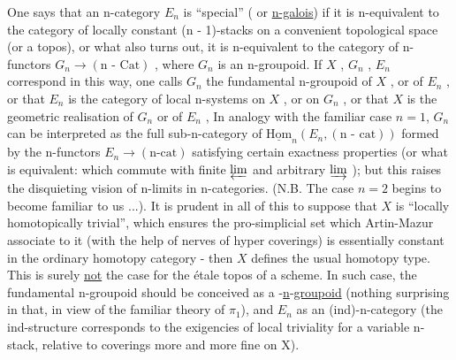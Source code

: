 
One says that an n-category $E_n$ is ``special'' ( or \uline{n-galois}) if
it is n-equivalent to the category of locally constant (n - 1)-stacks
on a convenient topological space (or a topos), or what also turns
out, it is n-equivalent to the category of n-functors
$G_n \to (\text{n - Cat})$ , where $G_n$ is an n-groupoid. If $X$ , $G_n$ , $E_n$
correspond in this way, one calls $G_n$ the fundamental n-groupoid
of $X$ , or of $E_n$ , or that $E_n$ is the category of local n-systems
on $X$ , or on $G_n$ , or that $X$ is the geometric realisation of
$G_n$ or of $E_n$ , In analogy with the familiar case $n = 1$, $G_n$
can be interpreted as the full sub-n-category of $\underline{\mathrm{Hom}}_n(E_n,(\text{n - cat}))$
formed by the n-functors $E_n \to (\text{n-cat})$ satisfying certain
exactness properties (or what is equivalent: which commute with
finite $\varprojlim$ and arbitrary $\varinjlim$ ); but this raises the disquieting
vision of n-limits in n-categories. (N.B. The case $n = 2$ begins
to become familiar to us ...). It is prudent in all of this to
suppose that $X$ is ``locally homotopically trivial'', which ensures
the pro-simplicial set which Artin-Mazur associate to it (with
the help of nerves of hyper coverings) is essentially constant in
the ordinary homotopy category - then $X$ defines the usual
homotopy type. This is surely \uline{not} the case for the étale topos
of a scheme. In such case, the fundamental n-groupoid should be
conceived as a -\uline{n}-\uline{groupoid} (nothing surprising in that, in view
of the familiar theory of $\pi_1$), and $E_n$ as an (ind)-n-category
(the ind-structure corresponds to the exigencies of local triviality
for a variable n-stack, relative to coverings more and more fine on
X).

